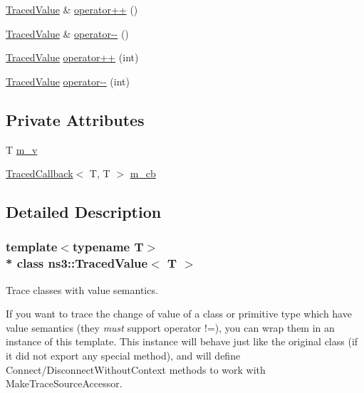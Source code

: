 {\bf }\par
\begin{DoxyCompactItemize}
\item 
\hyperlink{classns3_1_1TracedValue}{Traced\+Value} \& \hyperlink{classns3_1_1TracedValue_ac4a25efd55480c67351a1526abcd446c}{operator++} ()
\item 
\hyperlink{classns3_1_1TracedValue}{Traced\+Value} \& \hyperlink{classns3_1_1TracedValue_a812707d3d915fedd56074a4535b3bb9b}{operator-\/-\/} ()
\item 
\hyperlink{classns3_1_1TracedValue}{Traced\+Value} \hyperlink{classns3_1_1TracedValue_ad8f1b011504a48622cea7b962ce61ab7}{operator++} (int)
\item 
\hyperlink{classns3_1_1TracedValue}{Traced\+Value} \hyperlink{classns3_1_1TracedValue_a7cb4f1b817544171d9518f3479a3be17}{operator-\/-\/} (int)
\end{DoxyCompactItemize}

\subsection*{Private Attributes}
\begin{DoxyCompactItemize}
\item 
T \hyperlink{classns3_1_1TracedValue_a72b9ba60e98e4727f60db0896ed79c4c}{m\+\_\+v}
\item 
\hyperlink{classns3_1_1TracedCallback}{Traced\+Callback}$<$ T, T $>$ \hyperlink{classns3_1_1TracedValue_a4215ecb475ef435dad916b0d0a0040c5}{m\+\_\+cb}
\end{DoxyCompactItemize}


\subsection{Detailed Description}
\subsubsection*{template$<$typename T$>$\\*
class ns3\+::\+Traced\+Value$<$ T $>$}

Trace classes with value semantics. 

If you want to trace the change of value of a class or primitive type which have value semantics (they {\itshape must} support operator !=), you can wrap them in an instance of this template. This instance will behave just like the original class (if it did not export any special method), and will define Connect/\+Disconnect\+Without\+Context methods to work with Make\+Trace\+Source\+Accessor.


